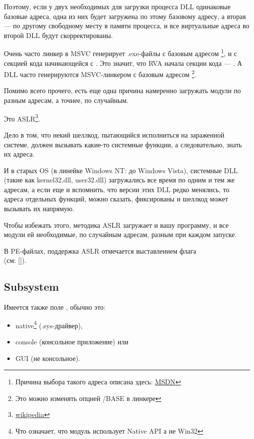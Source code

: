 Поэтому, если у двух необходимых для загрузки процесса DLL одинаковые базовые адреса,
одна из них будет загружена по этому базовому адресу, 
а вторая --- по другому свободному месту в памяти процесса, и все виртуальные адреса во второй DLL будут скорректированы.

\par Очень часто линкер в \ac{MSVC} генерирует .exe-файлы с базовым адресом  \footnote{Причина выбора такого адреса описана здесь: \href{http://go.yurichev.com/17041}{MSDN}},
и с секцией кода начинающейся с .
Это значит, что \ac{RVA} начала секции кода --- .
А \ac{DLL} часто генерируются MSVC-линкером с базовым адресом \footnote{Это можно изменять опцией /BASE в линкере}.

Помимо всего прочего, есть еще одна причина намеренно загружать модули по разным адресам, а точнее, по случайным.

Это \ac{ASLR}\footnote{\href{http://go.yurichev.com/17042}{wikipedia}}.

Дело в том, что некий шеллкод, пытающийся исполниться на зараженной системе, должен вызывать какие-то системные функции, а следовательно, знать их адреса.

И в старых \ac{OS} (в линейке \gls{Windows NT}: до Windows Vista),
системные DLL (такие как kernel32.dll, user32.dll) загружались все время
по одним и тем же адресам, 
а если еще и вспомнить, что версии этих DLL редко менялись, то адреса отдельных
функций, можно сказать, фиксированы и шеллкод может вызывать их напрямую.

Чтобы избежать этого, методика \ac{ASLR}
загружает и вашу программу, и все модули ей необходимые, по случайным адресам, разным при каждом запуске.

В PE-файлах, поддержка \ac{ASLR} отмечается выставлением флага \\
 (см: [\Russinovich]).

\subsection{Subsystem}

Имеется также поле , обычно это:

\begin{itemize}
\item native\footnote{Что означает, что модуль использует Native API а не Win32} (.sys-драйвер), 

\item console (консольное приложение) или

\item \ac{GUI} (не консольное).
\end{itemize}

